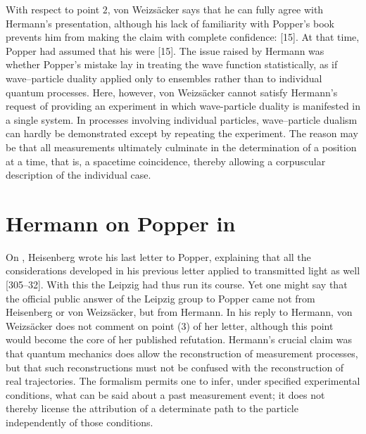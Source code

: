 \documentclass[final,12pt]{article}
\newcommand{\vW}{von Weizsäcker\xspace}
\begin{document}
With respect to point $2$, \vW says that he can fully agree with Hermann's presentation, although his lack of familiarity with Popper's book prevents him from making the claim with complete confidence:  [15]. At that time, Popper had assumed that his  were  [15]. The issue raised by Hermann was whether Popper's mistake lay in treating the wave function statistically, as if wave--particle duality applied only to ensembles rather than to individual quantum processes. Here, however, \vW cannot satisfy Hermann's request of providing an experiment in which wave-particle duality is manifested in a single system. In processes involving individual particles, wave--particle dualism can hardly be demonstrated except by repeating the experiment. The reason may be that all measurements ultimately culminate in the determination of a position at a time, that is, a spacetime coincidence, thereby allowing a corpuscular description of the individual case.


\section{Hermann on Popper in  }
%
On , Heisenberg wrote his last letter to Popper, explaining that all the considerations developed in his previous letter applied to transmitted light as well [305--32]. With this the Leipzig  had thus run its course. Yet one might say that the official public answer of the Leipzig group to Popper came not from Heisenberg or \vW, but from Hermann. In his reply to Hermann, \vW does not comment on point (3) of her letter, although this point would become the core of her published refutation. Hermann’s crucial claim was that quantum mechanics does allow the reconstruction of measurement processes, but that such reconstructions must not be confused with the reconstruction of real trajectories. The formalism permits one to infer, under specified experimental conditions, what can be said about a past measurement event; it does not thereby license the attribution of a determinate path to the particle independently of those conditions.
\end{document}
